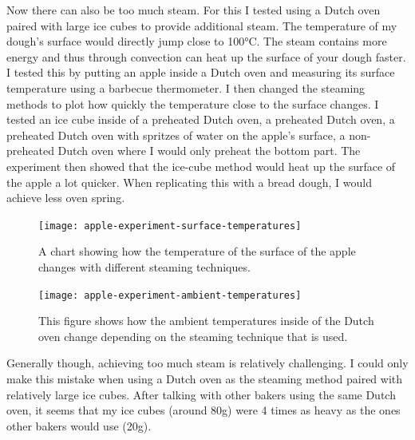 Now there can also be too much steam. For this I tested using a Dutch oven paired with large ice
cubes to provide additional steam. The temperature of my dough's surface would directly
jump close to 100°C. The steam contains more energy and thus through convection
can heat up the surface of your dough faster. I tested this by putting an apple inside
a Dutch oven and measuring its surface temperature using a barbecue thermometer.
I then changed the steaming methods to plot how quickly the temperature
close to the surface changes. I tested an ice cube inside of a preheated
Dutch oven, a preheated Dutch oven, a preheated Dutch oven with spritzes
of water on the apple's surface, a non-preheated Dutch oven where I would only preheat
the bottom part. The experiment then showed that the ice-cube method would heat up
the surface of the apple a lot quicker. When replicating this with a bread dough,
I would achieve less oven spring.

\begin{figure}[h]
  \texttt{[image: apple-experiment-surface-temperatures]}
  \caption{A chart showing how the temperature of the surface
  of the apple changes with different steaming techniques.}
  \label{apple-experiment-surface-temperatures}
\end{figure}

\begin{figure}[h]
  \texttt{[image: apple-experiment-ambient-temperatures]}
  \caption{This figure shows how the ambient temperatures inside of the
  Dutch oven change depending on the steaming technique that is used.}
  \label{apple-experiment-ambient-temperatures}
\end{figure}

Generally though, achieving too much steam is relatively challenging. I could only
make this mistake when using a Dutch oven as the steaming method paired with relatively
large ice cubes. After talking with other bakers using the same Dutch oven, it seems
that my ice cubes (around 80g) were 4 times as heavy as the ones other bakers
would use (20g).
